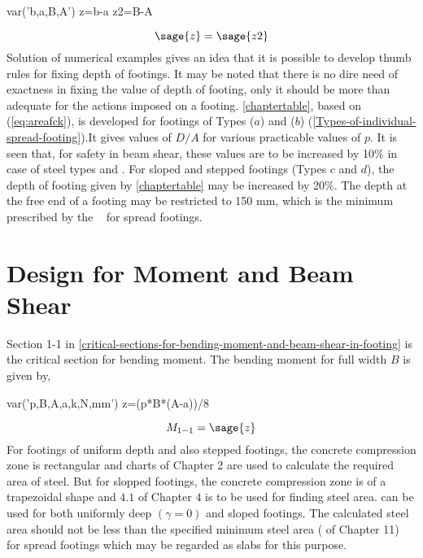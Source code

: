 \begin{sagesilent}                                                      
        var('b,a,B,A')                                                
        z=b-a
        z2=B-A                                                   
\end{sagesilent}

\begin{equation}
  \label{eq:equaloverhang}
           \sage{z}=\sage{z2} 
\end{equation}
Solution of numerical examples gives an idea that it is possible to
develop thumb rules for fixing depth of footings. It may be noted that
there is no dire need of exactness in fixing the value of depth of
footing, only it should be more than adequate for the actions imposed
on a footing. \tablem \ref{chaptertable}, based on
\eqn (\ref{eq:areafck}), is developed for footings of Types ($a$) 
and ($b$) (\fig \ref{Types-of-individual-spread-footing}).It gives
values of $D/A$ for various practicable values of $p$. It is seen that,
for safety in beam shear, these values are to be increased by 10\% in 
case of steel types \fefouronefive and \fefivezerozero. For 
sloped and stepped footings (Types $c$ and $d$), the depth of footing 
given by \tablem \ref{chaptertable} may be increased by 20\%. The
depth at the free end of a footing may be restricted to 150 mm, which 
is the minimum prescribed by the ~ for spread
footings.
 



\section{Design for Moment and Beam Shear} 
Section 1-1 in \fig \ref{critical-sections-for-bending-moment-and-beam-shear-in-footing} 
is the critical  section for bending moment.
The bending moment for full width $B$ is given by,

\begin{sagesilent}                                                      
        var('p,B,A,a,k,N,mm')                                                
        z=(p*B*(A-a))/8                                           
\end{sagesilent}  

\begin{equation}
        \label{eq:criticalMoment}
        M_{1-1}=\sage{z}
\end{equation}
For footings of uniform depth and also stepped footings, the concrete
compression zone is rectangular and charts of Chapter 2 are used to 
calculate the required area of steel. But for slopped footings, the 
concrete compression zone is of a trapezoidal shape and \chartm 
$4.1$ of Chapter $4$ is to be used for finding steel area.  can be used for both uniformly deep $(\gamma = 0)$ and sloped
footings. The calculated steel area should not be less than the 
speciﬁed minimum steel area ( of Chapter 11) for spread
footings which may be regarded as slabs for this purpose.

